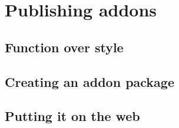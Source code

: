 \documentclass[Orbiter Developer Manual.tex]{subfiles}
\begin{document}
\section{Publishing addons}

\subsection{Function over style}

\subsection{Creating an addon package}

\subsection{Putting it on the web}
\end{document}
